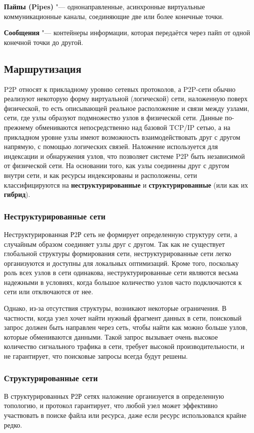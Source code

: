 \documentclass[bachelor, och, coursework]{SCWorks}
\begin{document}
\textbf{Пайпы (Pipes)} "--- однонаправленные, асинхронные виртуальные коммуникационные каналы, соединяющие две или более конечные точки.

\textbf{Сообщения} "--- контейнеры информации, которая передаётся через пайп от одной конечной точки до другой.

\subsection{Маршрутизация}
P2P относят к прикладному уровню сетевых протоколов, а P2P-сети обычно реализуют некоторую форму виртуальной (логической) сети, наложенную поверх физической, то есть описывающей реальное расположение
и связи между узлами, сети, где узлы образуют подмножество узлов в физической сети. 
Данные по-прежнему обмениваются непосредственно над базовой TCP/IP сетью, 
а на прикладном уровне узлы имеют возможность взаимодействовать друг с другом напрямую, 
с помощью логических связей. Наложение используется для индексации и обнаружения узлов, 
что позволяет системе P2P быть независимой от физической сети. На основании того, как узлы соединены 
друг с другом внутри сети, и как ресурсы индексированы и расположены, сети классифицируются на 
\textbf{неструктурированные} и \textbf{структурированные} (или как их \textbf{гибрид}).

\subsubsection{Неструктурированные сети}
Неструктурированная Р2Р сеть не формирует определенную структуру сети, а случайным образом соединяет узлы друг с другом. 
Так как не существует глобальной структуры формирования сети, неструктурированные сети легко организуются и доступны для локальных оптимизаций. 
Кроме того, поскольку роль всех узлов в сети одинакова, неструктурированные сети являются весьма надежными в условиях, 
когда большое количество узлов часто подключаются к сети или отключаются от нее.

Однако, из-за отсутствия структуры, возникают некоторые ограничения. 
В частности, когда узел хочет найти нужный фрагмент данных в сети, поисковый запрос должен быть направлен через сеть, 
чтобы найти как можно больше узлов, которые обмениваются данными. Такой запрос вызывает очень высокое количество сигнального трафика в сети, 
требует высокой производительности, и не гарантирует, что поисковые запросы всегда будут решены.

\subsubsection{Структурированные сети}
В структурированных Р2Р сетях наложение организуется в определенную топологию, и протокол гарантирует, 
что любой узел может эффективно участвовать в поиске файла или ресурса, даже если ресурс использовался крайне редко.
\end{document}
